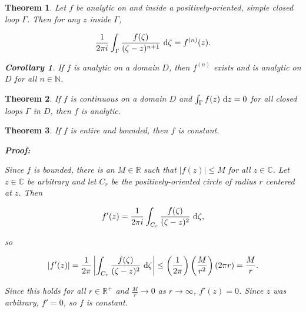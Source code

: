 \documentclass{article}
\theoremstyle{colontheorem}
\newtheorem{theorem}{Theorem}[section]
\newtheorem{corollary}{Corollary}[theorem]
\newenvironment{Theorem}
{
	\begin{mdframed}[backgroundcolor=TheoremOrange!10]
	\begin{theorem}
}
{
	\end{theorem}
	\end{mdframed}
	
	\vspace{.15in}
}
\newenvironment{Corollary}
{
	\begin{mdframed}[backgroundcolor=CorollaryBlue!10]
	\begin{corollary}
}
{
	\end{corollary}
	\end{mdframed}
	
	\vspace{.09in}
}
\newenvironment{Proof}
{
	\begin{mdframed}[backgroundcolor=ProofPurple!10]
	\textbf{Proof:}%
}
{
	\end{mdframed}
	
	\vspace{.085in}
}
\begin{document}
\begin{Theorem}
	
	Let $f$ be analytic on and inside a positively-oriented, simple closed loop $\Gamma$. Then for any $z$ inside $\Gamma$,
	
	$$
		\frac{1}{2\pi i} \int_{\Gamma} \frac{f(\zeta)}{(\zeta - z)^{n+1}}\ \textnormal{d}\zeta = f^{(n)}(z).
	$$
	
	\begin{Corollary}
		
		If $f$ is analytic on a domain $D$, then $f^{(n)}$ exists and is analytic on $D$ for all $n \in \mathbb{N}$.
		
	\end{Corollary}
	
\end{Theorem}



\begin{Theorem}
	
	If $f$ is continuous on a domain $D$ and $\int_{\Gamma} f(z)\ \textnormal{d}z = 0$ for all closed loops $\Gamma$ in $D$, then $f$ is analytic.
	
\end{Theorem}



\begin{Theorem}
	
	If $f$ is entire and bounded, then $f$ is constant.
	
	\begin{Proof}
		Since $f$ is bounded, there is an $M \in \mathbb{R}$ such that $|f(z)| \leq M$ for all $z \in \mathbb{C}$. Let $z \in \mathbb{C}$ be arbitrary and let $C_r$ be the positively-oriented circle of radius $r$ centered at $z$. Then
		
		$$
			f'(z) = \frac{1}{2\pi i} \int_{C_r} \frac{f(\zeta)}{(\zeta - z)^2}\ \textnormal{d}\zeta \textnormal{,}
		$$
		
		so
		
		$$
			|f'(z)| = \frac{1}{2 \pi} \left| \int_{C_r} \frac{f(\zeta)}{(\zeta - z)^2}\ \textnormal{d}\zeta \right| \leq \left( \frac{1}{2\pi} \right) \left( \frac{M}{r^2} \right) (2 \pi r) = \frac{M}{r}.
		$$
		
		Since this holds for all $r \in \mathbb{R}^+$ and $\frac{M}{r} \to 0$ as $r \to \infty$, $f'(z) = 0$. Since $z$ was arbitrary, $f' = 0$, so $f$ is constant.
		
	\end{Proof}
	
\end{Theorem}
\end{document}
